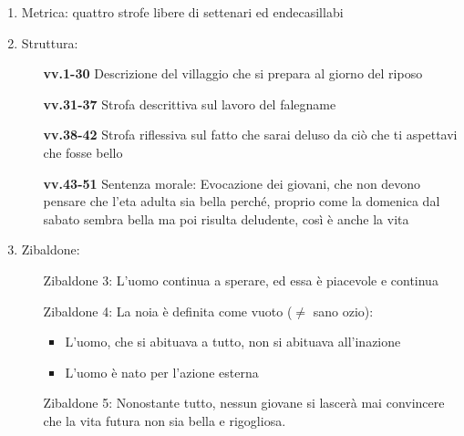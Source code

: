 \documentclass{article}
\begin{document}
\newpage
\begin{enumerate}
    \item Metrica: quattro strofe libere di settenari ed endecasillabi
    \item Struttura:
        \begin{itemize}
            \item[\textbf{vv.1-30}] Descrizione del villaggio che si prepara al giorno del
                riposo
            \item[\textbf{vv.31-37}] Strofa descrittiva sul lavoro del falegname
            \item[\textbf{vv.38-42}] Strofa riflessiva sul fatto che sarai deluso da ciò che
                ti aspettavi che fosse bello
            \item[\textbf{vv.43-51}] Sentenza morale: Evocazione dei giovani, che non devono
                pensare che l'eta adulta sia bella perché, proprio come la domenica dal sabato
                sembra bella ma poi risulta deludente, così è anche la vita
        \end{itemize}
    \item Zibaldone:
        \begin{itemize}
            \item[Zibaldone 3:] L'uomo continua a sperare, ed essa è piacevole e continua
            \item[Zibaldone 4:] La noia è definita come vuoto ($\neq$ sano ozio):
                \begin{itemize}
                    \item L'uomo, che si abituava a tutto, non si abituava all'inazione
                    \item L'uomo è nato per l'azione esterna
                \end{itemize} 
            \item[Zibaldone 5:] Nonostante tutto, nessun giovane si lascerà mai convincere che
                la vita futura non sia bella e rigogliosa.
        \end{itemize}
\end{enumerate}
\end{document}
